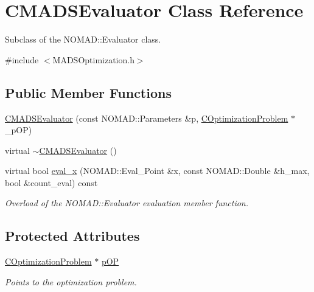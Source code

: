 \hypertarget{class_c_m_a_d_s_evaluator}{\section{C\-M\-A\-D\-S\-Evaluator Class Reference}
\label{class_c_m_a_d_s_evaluator}
}


Subclass of the N\-O\-M\-A\-D\-::\-Evaluator class.  




{\ttfamily \#include $<$M\-A\-D\-S\-Optimization.\-h$>$}

\subsection*{Public Member Functions}
\begin{DoxyCompactItemize}
\item 
\hyperlink{class_c_m_a_d_s_evaluator_a3ae7243b3f23a630859dcf372178557a}{C\-M\-A\-D\-S\-Evaluator} (const N\-O\-M\-A\-D\-::\-Parameters \&p, \hyperlink{class_c_optimization_problem}{C\-Optimization\-Problem} $\ast$\-\_\-p\-O\-P)
\item 
virtual \hyperlink{class_c_m_a_d_s_evaluator_a75bab21cf6a5fc296e6eb4cfdfb66060}{$\sim$\-C\-M\-A\-D\-S\-Evaluator} ()
\item 
virtual bool \hyperlink{class_c_m_a_d_s_evaluator_a5584e20930e48738e6473a2775202b33}{eval\-\_\-x} (N\-O\-M\-A\-D\-::\-Eval\-\_\-\-Point \&x, const N\-O\-M\-A\-D\-::\-Double \&h\-\_\-max, bool \&count\-\_\-eval) const 
\begin{DoxyCompactList}\small\item\em Overload of the N\-O\-M\-A\-D\-::\-Evaluator evaluation member function. \end{DoxyCompactList}\end{DoxyCompactItemize}
\subsection*{Protected Attributes}
\begin{DoxyCompactItemize}
\item 
\hyperlink{class_c_optimization_problem}{C\-Optimization\-Problem} $\ast$ \hyperlink{class_c_m_a_d_s_evaluator_a49023f451dbaf2b13610074139184e82}{p\-O\-P}
\begin{DoxyCompactList}\small\item\em Points to the optimization problem. \end{DoxyCompactList}\end{DoxyCompactItemize}


